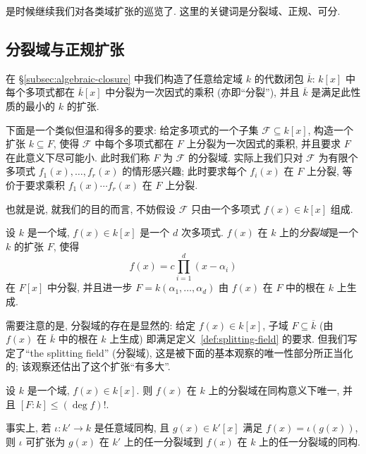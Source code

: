 是时候继续我们对各类域扩张的巡览了. 这里的关键词是分裂域、正规、可分.

\subsection{分裂域与正规扩张}\label{subsec:splitting-fields}

在 §\ref{subsec:algebraic-closure} 中我们构造了任意给定域 $k$ 的代数闭包 $\overline{k}$: $k[x]$ 中每个多项式都在 $\overline{k}[x]$ 中分裂为一次因式的乘积 (亦即``分裂''), 并且 $\overline{k}$ 是满足此性质的最小的 $k$ 的扩张.

下面是一个类似但温和得多的要求: 给定多项式的一个子集 $\mathcal{F}\subseteq k[x]$, 构造一个扩张 $k\subseteq F$, 使得 $\mathcal{F}$ 中每个多项式都在 $F$ 上分裂为一次因式的乘积, 并且要求 $F$ 在此意义下尽可能小. 此时我们称 $F$ 为 $\mathcal{F}$ 的分裂域. 实际上我们只对 $\mathcal{F}$ 为有限个多项式 $f_1(x),\ldots,f_r(x)$ 的情形感兴趣; 此时要求每个 $f_i(x)$ 在 $F$ 上分裂, 等价于要求乘积 $f_1(x)\cdots f_r(x)$ 在 $F$ 上分裂.

也就是说, 就我们的目的而言, 不妨假设 $\mathcal{F}$ 只由一个多项式 $f(x)\in k[x]$ 组成.

\begin{definition}\label{def:splitting-field}
设 $k$ 是一个域, $f(x)\in k[x]$ 是一个 $d$ 次多项式. $f(x)$ 在 $k$ 上的\emph{分裂域}是一个 $k$ 的扩张 $F$, 使得
\[
f(x)=c\prod_{i=1}^{d}(x-\alpha_i)
\]
在 $F[x]$ 中分裂, 并且进一步 $F=k(\alpha_1,\ldots,\alpha_d)$ 由 $f(x)$ 在 $F$ 中的根在 $k$ 上生成.
\end{definition}

需要注意的是, 分裂域的存在是显然的: 给定 $f(x)\in k[x]$, 子域 $F\subseteq\overline{k}$ (由 $f(x)$ 在 $\overline{k}$ 中的根在 $k$ 上生成) 即满足定义~\ref{def:splitting-field} 的要求. 但我们写定了``the splitting field'' (分裂域), 这是被下面的基本观察的唯一性部分所正当化的; 该观察还估出了这个扩张``有多大''.

\begin{lemma}\label{lem:splitting-field-unique}
设 $k$ 是一个域, $f(x)\in k[x]$. 则 $f(x)$ 在 $k$ 上的分裂域在同构意义下唯一, 并且 $[F:k]\leq(\deg f)!$.

事实上, 若 $\iota:k'\to k$ 是任意域同构, 且 $g(x)\in k'[x]$ 满足 $f(x)=\iota(g(x))$, 则 $\iota$ 可扩张为 $g(x)$ 在 $k'$ 上的任一分裂域到 $f(x)$ 在 $k$ 上的任一分裂域的同构.
\end{lemma}

